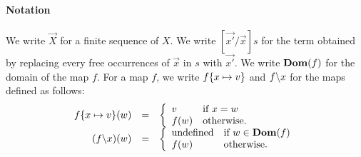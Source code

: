 



\paragraph{Notation} We write \(\vec{X}\) for a finite sequence of
\(X\).  We write \([\vec{x'}/\vec{x}]s\) for the term obtained by
replacing every free occurrences of \(\vec{x}\) in \(s\) with
\(\vec{x'}\).  We write \(\mathbf{Dom}(f)\) for the domain of the map \(f\).  For a
map \(f\), we write \(f \{x \mapsto v\}\) and \(f \backslash x\) for the
maps defined as follows:
\[
\begin{array}{rcl}
f \{x \mapsto v\} (w) &=&
\left\{
\begin{array}{ll}
v & \mbox{if \(x = w\)}\\
f(w) & \mbox{otherwise.}
\end{array}
\right.\\
(f \backslash x)(w) &=&
\left\{
\begin{array}{ll}
\mbox{undefined} & \mbox{if \(w \in \mathbf{Dom}(f)\)}\\
f(w) & \mbox{otherwise.}
\end{array}
\right.
\end{array}
\]
